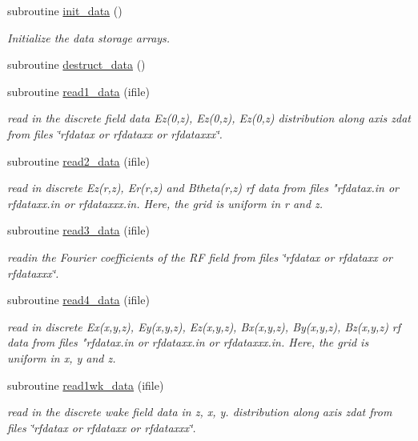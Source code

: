 \begin{DoxyCompactItemize}
\item 
subroutine \mbox{\hyperlink{namespacedataclass_a474ffe5e76484d63015aaf6255c27294}{init\+\_\+data}} ()
\begin{DoxyCompactList}\small\item\em Initialize the data storage arrays. \end{DoxyCompactList}\item 
subroutine \mbox{\hyperlink{namespacedataclass_ac5b255034c2a115b6740378b4d1e630e}{destruct\+\_\+data}} ()
\item 
subroutine \mbox{\hyperlink{namespacedataclass_a6733af7e3067d69140c61e2b4580a70b}{read1\+\_\+data}} (ifile)
\begin{DoxyCompactList}\small\item\em read in the discrete field data Ez(0,z), Ez\textquotesingle{}(0,z), Ez\textquotesingle{}\textquotesingle{}(0,z) distribution along axis zdat from files \char`\"{}rfdatax or rfdataxx 
 or rfdataxxx\char`\"{}. \end{DoxyCompactList}\item 
subroutine \mbox{\hyperlink{namespacedataclass_abf0c8413e040d7ea8c0bc5df73c9ef96}{read2\+\_\+data}} (ifile)
\begin{DoxyCompactList}\small\item\em read in discrete Ez(r,z), Er(r,z) and Btheta(r,z) rf data from files "rfdatax.\+in or rfdataxx.\+in or rfdataxxx.\+in. Here, the grid is uniform in r and z. \end{DoxyCompactList}\item 
subroutine \mbox{\hyperlink{namespacedataclass_a39afae6095340e01362de7d4876aee60}{read3\+\_\+data}} (ifile)
\begin{DoxyCompactList}\small\item\em readin the Fourier coefficients of the RF field from files \char`\"{}rfdatax or rfdataxx or rfdataxxx\char`\"{}. \end{DoxyCompactList}\item 
subroutine \mbox{\hyperlink{namespacedataclass_a2ef1f00ff4295094270a70c5d3763019}{read4\+\_\+data}} (ifile)
\begin{DoxyCompactList}\small\item\em read in discrete Ex(x,y,z), Ey(x,y,z), Ez(x,y,z), Bx(x,y,z), By(x,y,z), Bz(x,y,z) rf data from files "rfdatax.\+in or rfdataxx.\+in or rfdataxxx.\+in. Here, the grid is uniform in x, y and z. \end{DoxyCompactList}\item 
subroutine \mbox{\hyperlink{namespacedataclass_a2fed396f3daf5a5c465b01235d98c776}{read1wk\+\_\+data}} (ifile)
\begin{DoxyCompactList}\small\item\em read in the discrete wake field data in z, x, y. distribution along axis zdat from files \char`\"{}rfdatax or rfdataxx 
 or rfdataxxx\char`\"{}. \end{DoxyCompactList}\end{DoxyCompactItemize}
